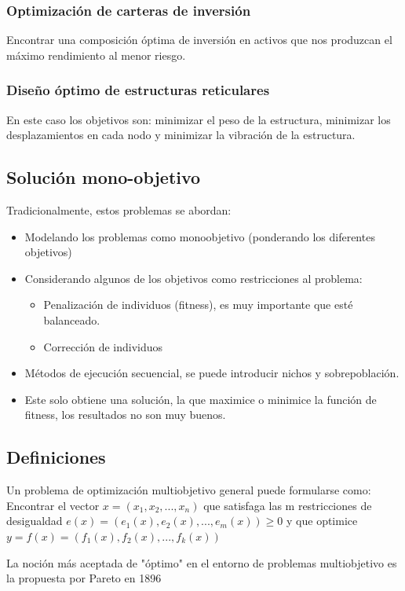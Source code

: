 \documentclass[12pt, twoside, openright]{report} %
\begin{document}
\subsubsection{Optimización de carteras de inversión} 
Encontrar una composición óptima de inversión en activos que nos produzcan el máximo rendimiento al menor riesgo.

\subsubsection{Diseño óptimo de estructuras reticulares} 
En este caso los objetivos son: minimizar el peso de la estructura, minimizar los desplazamientos en cada nodo y minimizar la vibración de la estructura.

\subsection{Solución mono-objetivo}
Tradicionalmente, estos problemas se abordan:
\begin{itemize}
	\item Modelando los problemas como monoobjetivo (ponderando los diferentes objetivos)
	\item Considerando algunos de los objetivos como restricciones al problema:
	\begin{itemize}
		\item Penalización de individuos (fitness), es muy importante que esté balanceado.
		\item Corrección de individuos
	\end{itemize}
	\item Métodos de ejecución secuencial, se puede introducir nichos y sobrepoblación.
	\item Este solo obtiene una solución, la que maximice o minimice la función de fitness, los resultados no son muy buenos.
\end{itemize}

\subsection{Definiciones}
Un problema de optimización multiobjetivo general puede formularse como: Encontrar el vector $x = (x_1, x_2, ..., x_n)$ que satisfaga las m restricciones de desigualdad $e(x) = (e_1(x), e_2(x), ..., e_m(x)) \geq 0$ y que optimice $y = f (x) = (f_1(x), f_2(x), ..., f_k(x))$

La noción más aceptada de "óptimo" en el entorno de problemas multiobjetivo es la propuesta por Pareto en 1896
\end{document}
